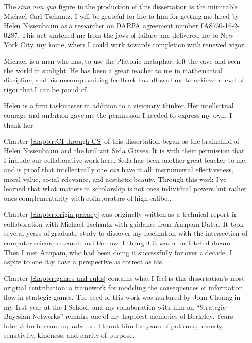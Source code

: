\documentclass[../thesis.tex]{subfiles}
\begin{document}
 The \textit{sina non qua} figure in the production of
 this dissertation is the inimitable Michael Carl Tschantz.
 I will be grateful for life to him for getting me hired by
 Helen Nissenbaum as a researcher on DARPA agreement number FA8750-16-2-0287.
 This act snatched me from the jaws of failure and delivered me
 to New York City, my home, where I could work towards completion with renewed vigor.

 Michael is a man who has, to use the Platonic metaphor,
 left the cave and seen the world in sunlight.
 He has been a great teacher to me in mathematical discipline,
 and his uncompromising feedback has allowed me to
 achieve a  level of rigor that I can be proud of.

 Helen is a firm taskmaster in addition to a visionary thinker.
 Her intellectual courage and ambition gave me the permission I needed to express my own.
 I thank her.
 
 Chapter \ref{chapter:CI-through-CS} of this dissertation began as the brainchild
 of Helen Nissenbaum and the brilliant Seda G{\"u}rses.
 It is with their permission that I include our collaborative work here.
 Seda has been another great teacher to me,
 and is proof that intellectually
 one \textit{can} have it all:
 instrumental effectiveness, moral value, social relevance,
 and aesthetic beauty.
 Through this work I've learned that what matters in
 scholarship is not ones individual powers but rather
 ones complementarity with collaborators of high caliber.

 Chapter \ref{chapter:origin-privacy} was originally written
 as a technical report in collaboration with Michael Tschantz
 with guidance from Anupam Datta.
 It took several years of graduate study to discover my
 fascination with the intersection of computer science
 research and the law.
 I thought it was a far-fetched dream.
 Then I met Anupam,
 who had been doing it successfully for over a decade.
 I aspire to one day have a perspective as correct as his.

 Chapter \ref{chapter:games-and-rules} contains what I feel
 is this dissertation's most original contribution:
 a framework for modeling the consequences of information flow
 in strategic games.
 The seed of this work was nurtured by John Chuang
 in my first year at the I School, and my collaboration
 with him on ``Strategic Bayesian Networks'' remains one of
 my happiest memories of Berkeley.
 Years later John became my advisor.
 I thank him for years of patience, honesty, sensitivity,
 kindness, and clarity of purpose.
\end{document}
